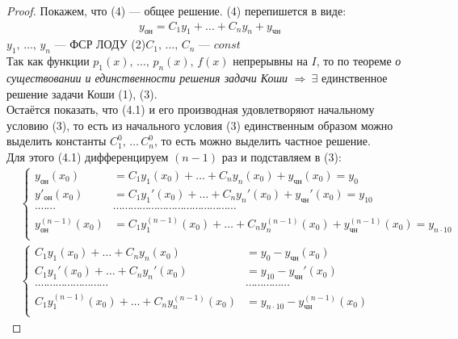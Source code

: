\begin{proof}
    Покажем, что (4) --- общее решение. (4) перепишется в виде:
    \begin{align*}
        y_{\text{он}} = C_1 y_1 + \dots + C_n y_n + y_{\text{чн}} \tag{4.1}
    \end{align*}
    $y_1,\, \ldots,\, y_n$ --- ФСР ЛОДУ (2)\qquad $C_1,\, \ldots,\, C_n$ --- $const$\\[1ex]
    Так как функции $p_1(x),\, \ldots,\, p_n(x),\, f(x)$ непрерывны на $I$, то по теореме \textit{о существовании и единственности решения задачи Коши} $\Rightarrow\ \exists$ единственное решение задачи Коши (1), (3). \\[1ex]
    Остаётся показать, что (4.1) и его производная удовлетворяют начальному условию (3), то есть из начального условия (3) единственным образом можно выделить константы $C_1^0,\, \ldots\, C_n^0$, то есть можно выделить частное решение. \\
    Для этого (4.1) дифференцируем $(n - 1)$ раз и подставляем в (3):
    \begin{align*}
        &\left\{ \begin{aligned}
            y_\text{он} (x_0) &= C_1y_1 (x_0) + \dots + C_ny_n (x_0) + y_{\text{чн}} (x_0) = y_0 \\
            y'_\text{он} (x_0) &= C_1y_1' (x_0) + \dots + C_ny_n' (x_0) + y_{\text{чн}}' (x_0) = y_{10} \\
            \cdot\cdots\cdots&\cdots\cdots\cdots\cdots\cdots\cdots\cdots\cdots\cdots\cdots\cdots\cdots\cdots\cdots \\
            y_\text{он}^{(n-1)} (x_0) &= C_1y_1^{(n-1)} (x_0) + \dots + C_ny_n^{(n-1)} (x_0) + y_{\text{чн}}^{(n-1)} (x_0) = y_{n\cdot 10} \\
        \end{aligned} \right. \\[1ex]
        &\left\{ \begin{aligned}
            C_1y_1 (x_0) + \dots + C_ny_n (x_0) &= y_0 - y_{\text{чн}} (x_0)\\
            C_1y_1' (x_0) + \dots + C_ny_n' (x_0) &= y_{10} - y_{\text{чн}}' (x_0)  \\
            \cdot\cdots\cdots\cdots\cdots\cdots\cdots\cdots\cdots&\cdots\cdots\cdots\cdots\cdots \\
            C_1y_1^{(n-1)} (x_0) + \dots + C_ny_n^{(n-1)} (x_0) &= y_{n\cdot 10} - y_{\text{чн}}^{(n-1)} (x_0) \\
        \end{aligned} \right. \tag{5}
    \end{align*} 

\end{proof}
